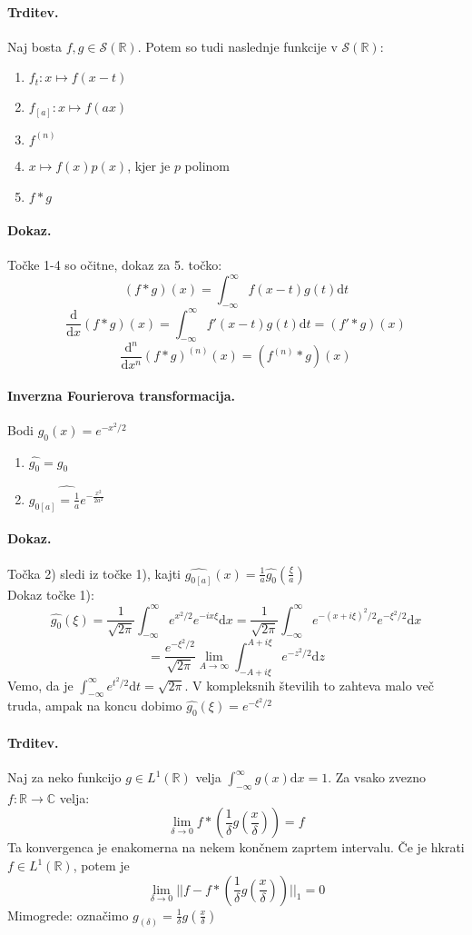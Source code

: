 \documentclass[a4paper]{article}
\newcommand{\dif}{\mathrm{d}}
\newcommand{\dd}[2]{\frac{\mathrm{d} {#1}}{\mathrm{d} {#2}}}
\newcommand{\C}{\mathbb{C}}
\newcommand{\R}{\mathbb{R}}
\newcommand{\fn}[3]{{#1}\colon {#2} \rightarrow {#3}}
\newcommand{\Lim}[1]{\lim_{{#1} \rightarrow \infty}}
\newcommand{\Int}{\int_{-\infty}^{\infty}}
\begin{document}
\paragraph{Trditev.} Naj bosta $f, g \in \mathcal{S}(\R)$. Potem so tudi naslednje funkcije v $\mathcal{S}(\R)$:
\begin{enumerate}
    \item $f_t: x \mapsto f(x-t)$
    \item $f_{[a]}: x \mapsto f(ax)$
    \item $f^{(n)}$
    \item $x \mapsto f(x)p(x)$, kjer je $p$ polinom
    \item $f * g$
\end{enumerate}
\paragraph{Dokaz.} Točke 1-4 so očitne, dokaz za 5. točko:
$$(f * g)(x) = \int_{-\infty}^{\infty}f(x-t)g(t)\dif t$$
$$\dd{}{x}(f * g)(x) = \int_{-\infty}^{\infty} f'(x-t)g(t)\dif t = (f' * g)(x)$$
$$\dd{^n}{x^n}(f * g)^{(n)}(x) = (f^{(n)}*g)(x)$$
\paragraph{Inverzna Fourierova transformacija.} Bodi $g_0(x) = e^{-x^2/2}$
\begin{enumerate}
    \item $\widehat{g_0} = g_0$
    \item $\widehat{g_{0[a]} = \frac{1}{a}e^{-\frac{x^2}{2a^2}}}$
\end{enumerate}
\paragraph{Dokaz.} Točka 2) sledi iz točke 1), kajti $\widehat{g_{0[a]}}(x) = \frac{1}{a}\widehat{g_0}(\frac{\xi}{a})$ \\[2mm]
Dokaz točke 1): $$\widehat{g_0}(\xi) = \frac{1}{\sqrt{2\pi}} \int_{-\infty}^{\infty} e^{x^2/2} e^{-ix\xi}\dif x = \frac{1}{\sqrt{2\pi}}\Int e^{-(x+i\xi)^2/2}e^{-\xi^2/2}\dif x$$
$$= \frac{e^{-\xi^2/2}}{\sqrt{2\pi}} \Lim{A} \int_{-A+i\xi}^{A+i\xi} e^{-z^2/2}\dif z$$
Vemo, da je $\displaystyle{\int_{-\infty}^{\infty} e^{t^2/2} \dif t = \sqrt{2\pi}}$. V kompleksnih številih to zahteva malo več truda, ampak na koncu dobimo $\widehat{g_0}(\xi) = e^{-\xi^2/2}$
\paragraph{Trditev.} Naj za neko funkcijo $g \in L^1(\R)$ velja $\displaystyle{\Int g(x)\dif x = 1}$. Za vsako zvezno $\fn{f}{\R}{\C}$ velja:
$$\lim_{\delta \to 0} f * \left(\frac{1}{\delta}g(\frac{x}{\delta})\right) = f$$
Ta konvergenca je enakomerna na nekem končnem zaprtem intervalu. Če je hkrati $f \in L^1(\R)$, potem je
$$\lim_{\delta \to 0} ||f - f * \left(\frac{1}{\delta}g(\frac{x}{\delta})\right)||_1 = 0$$
Mimogrede: označimo $\displaystyle{g_{(\delta)} = \frac{1}{\delta}g\left(\frac{x}{\delta}\right)}$
\end{document}

